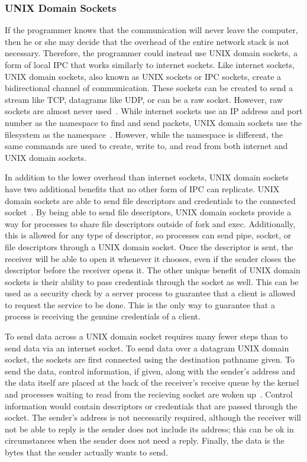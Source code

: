 \subsubsection{UNIX Domain Sockets}
If the programmer knows that the communication will never leave the computer, then he or she may decide that the overhead of the entire network stack is not necessary.  Therefore, the programmer could instead use UNIX domain sockets, a form of local IPC that works similarly to internet sockets.  Like internet sockets, UNIX domain sockets, also known as UNIX sockets or IPC sockets, create a bidirectional channel of communication.  These sockets can be created to send a stream like TCP, datagrams like UDP, or can be a raw socket.  However, raw sockets are almost never used~\cite[229--230]{Stevens:1996:TIT:233130}.  While internet sockets use an IP address and port number as the namespace to find and send packets, UNIX domain sockets use the filesystem as the namespace~\cite[231]{Stevens:1996:TIT:233130}.  However, while the namespace is different, the same commands are used to create, write to, and read from both internet and UNIX domain sockets.

In addition to the lower overhead than internet sockets, UNIX domain sockets have two additional benefits that no other form of IPC can replicate.  UNIX domain sockets are able to send file descriptors and credentials to the connected socket~\cite[381--394]{Stevens:1997:UNP:522800}.  By being able to send file descriptors, UNIX domain sockets provide a way for processes to share file descriptors outside of fork and exec.  Additionally, this is allowed for any type of descriptor, so processes can send pipe, socket, or file descriptors through a UNIX domain socket.  Once the descriptor is sent, the receiver will be able to open it whenever it chooses, even if the sender closes the descriptor before the receiver opens it.  The other unique benefit of UNIX domain sockets is their ability to pass credentials through the socket as well.  This can be used as a security check by a server process to guarantee that a client is allowed to request the service to be done.  This is the only way to guarantee that a process is receiving the genuine credentials of a client.

To send data across a UNIX domain socket requires many fewer steps than to send data via an internet socket.  To send data over a datagram UNIX domain socket, the sockets are first connected using the destination pathname given.  To send the data, control information, if given, along with the sender's address and the data itself are placed at the back of the receiver's receive queue by the kernel and processes waiting to read from the recieving socket are woken up~\cite[263--265]{Stevens:1996:TIT:233130}.  Control information would contain descriptors or credentials that are passed through the socket.  The sender's address is not necessarily required, although the receiver will not be able to reply is the sender does not include its address; this can be ok in circumstances when the sender does not need a reply.  Finally, the data is the bytes that the sender actually wants to send.

